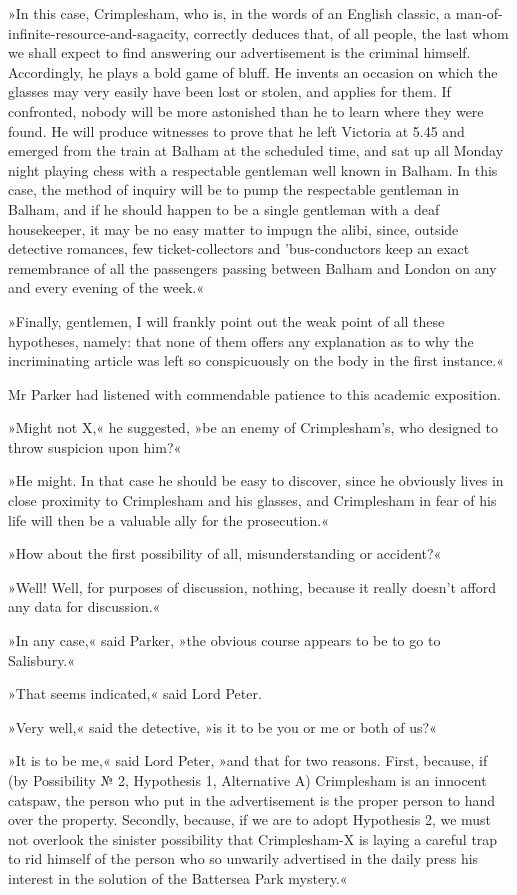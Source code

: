 »In this case, Crimplesham, who is, in the words of an English classic, a man-of-infinite-resource-and-sagacity, correctly deduces that, of all people, the last whom we shall expect to find answering our advertisement is the criminal himself. Accordingly, he plays a bold game of bluff. He invents an occasion on which the glasses may very easily have been lost or stolen, and applies for them. If confronted, nobody will be more astonished than he to learn where they were found. He will produce witnesses to prove that he left Victoria at 5.45 and emerged from the train at Balham at the scheduled time, and sat up all Monday night playing chess with a respectable gentleman well known in Balham. In this case, the method of inquiry will be to pump the respectable gentleman in Balham, and if he should happen to be a single gentleman with a deaf housekeeper, it may be no easy matter to impugn the alibi, since, outside detective romances, few ticket-collectors and 'bus-conductors keep an exact remembrance of all the passengers passing between Balham and London on any and every evening of the week.«

»Finally, gentlemen, I will frankly point out the weak point of all these hypotheses, namely: that none of them offers any explanation as to why the incriminating article was left so conspicuously on the body in the first instance.«

Mr Parker had listened with commendable patience to this academic exposition.

»Might not X,« he suggested, »be an enemy of Crimplesham's, who designed to throw suspicion upon him?«

»He might. In that case he should be easy to discover, since he obviously lives in close proximity to Crimplesham and his glasses, and Crimplesham in fear of his life will then be a valuable ally for the prosecution.«

»How about the first possibility of all, misunderstanding or accident?«

»Well! Well, for purposes of discussion, nothing, because it really doesn't afford any data for discussion.«

»In any case,« said Parker, »the obvious course appears to be to go to Salisbury.«

»That seems indicated,« said Lord Peter.

»Very well,« said the detective, »is it to be you or me or both of us?«

»It is to be me,« said Lord Peter, »and that for two reasons. First, because, if (by Possibility № 2, Hypothesis 1, Alternative A) Crimplesham is an innocent catspaw, the person who put in the advertisement is the proper person to hand over the property. Secondly, because, if we are to adopt Hypothesis 2, we must not overlook the sinister possibility that Crimplesham-X is laying a careful trap to rid himself of the person who so unwarily advertised in the daily press his interest in the solution of the Battersea Park mystery.«

